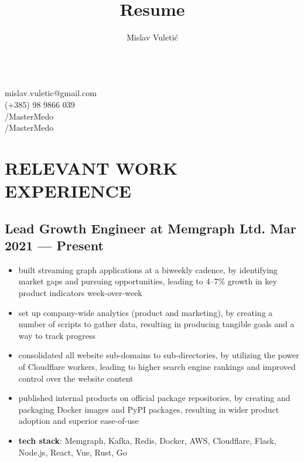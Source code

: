 \documentclass{article}
\begin{document}
\title{Resume}
\author{Mislav Vuletić}

\begin{multicols}{2}
  \fontsize{20}{20}\bfseries
  \theauthor{}

  \fontsize{15}{15}\mdseries
  \mbox{}\\
   mislav.vuletic@gmail.com\\
   (+385) 98 9866 039\\
  /MasterMedo\\
  /MasterMedo
\end{multicols}


\normalsize

\section{RELEVANT WORK EXPERIENCE}
\subsection{Lead Growth Engineer at Memgraph Ltd. \hfill Mar 2021 --- Present}
\begin{itemize}
  \itemsep0em
  \item built streaming graph applications at a biweekly cadence, by identifying market gaps and pursuing opportunities, leading to 4--7\% growth in key product indicators week-over-week
  \item set up company-wide analytics (product and marketing), by creating a number of scripts to gather data, resulting in producing tangible goals and a way to track progress
  \item consolidated all website sub-domains to sub-directories, by utilizing the power of Cloudflare workers, leading to higher search engine rankings and improved control over the website content
  \item published internal products on official package repositories, by creating and packaging Docker images and PyPI packages, resulting in wider product adoption and superior ease-of-use
  \item {\bfseries tech stack}: Memgraph, Kafka, Redis, Docker, AWS, Cloudflare, Flask, Node.js, React, Vue, Rust, Go
\end{itemize}
\end{document}
